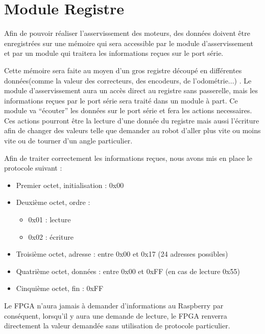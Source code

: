 \section {Module Registre}
Afin de pouvoir réaliser l'asservissement des moteurs, des données doivent être enregistrées sur une mémoire qui sera accessible par le module d'asservissement 
et par un module qui traitera les informations reçues sur le port série. 

Cette mémoire sera faite au moyen d'un gros registre découpé en différentes données(comme la valeur des correcteurs, des encodeurs, de l'odométrie...) . 
Le module d'asservissement aura un accès direct au registre sans passerelle, mais les informations reçues par le port série sera traité dans un module à part.
Ce module va ``écouter'' les données sur le port série et fera les actions necessaires. Ces actions pourront être la lecture d'une donnée du registre mais aussi 
l'écriture afin de changer des valeurs telle que demander au robot d'aller plus vite ou moins vite ou de tourner d'un angle particulier.


Afin de traiter correctement les informations reçues, nous avons mis en place le protocole suivant :

\begin{itemize}

\item Premier octet, initialisation : 0x00
\item Deuxième octet, ordre :
  \begin{itemize} 
    \item 0x01 : lecture
    \item 0x02 : écriture
   \end{itemize}
\item Troisième octet, adresse : entre 0x00 et 0x17 (24 adresses possibles)
\item Quatrième octet, données : entre 0x00 et 0xFF (en cas de lecture 0x55)
\item Cinquième octet, fin : 0xFF
\end{itemize}


Le FPGA n'aura jamais à demander d'informations au Raspberry par conséquent, lorsqu'il y aura une demande de lecture, le FPGA renverra directement la valeur demandée sans utilisation de protocole particulier.

